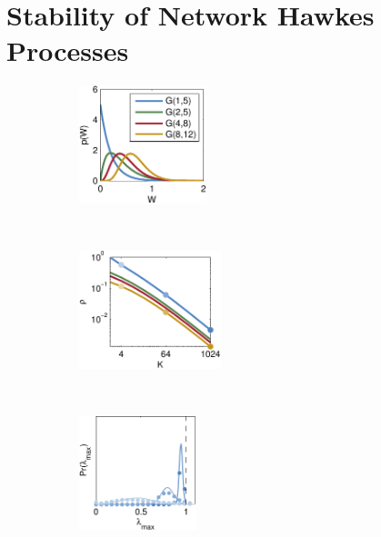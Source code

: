 \section{Stability of Network Hawkes Processes}
\label{sec:stability}

\begin{figure}[!ht]
\vspace{-.5em}
\begin{center}
\begin{subfigure}[b]{.22\textwidth}
\caption{}
\label{fig:stability_p_w}
\includegraphics[height=1.35in]{figures/ch2/stability_p_w} 
\end{subfigure}
~
\begin{subfigure}[b]{.22\textwidth}
\caption{}
\label{fig:stability_max_rho}
\includegraphics[height=1.35in]{figures/ch2/stability_max_rho} 
\end{subfigure}
~
\hspace{1em}
\begin{subfigure}[b]{.22\textwidth}
\caption{}
\label{fig:stability_1_5}
\includegraphics[height=1.3in]{figures/ch2/stability_1_5} 
\end{subfigure}
~
\begin{subfigure}[b]{.22\textwidth}

\end{subfigure}
\end{center}
\end{figure}

